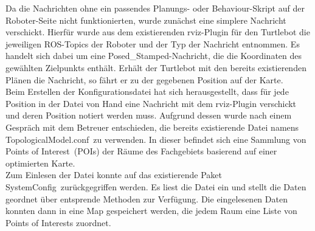 \documentclass[a4paper,12pt,headsepline]{scrartcl}
\begin{document}
		Da die Nachrichten ohne ein passendes Planungs- oder Behaviour-Skript auf der Roboter-Seite nicht funktionierten, wurde zunächst eine simplere Nachricht verschickt. Hierfür wurde aus dem existierenden rviz-Plugin für den Turtlebot die jeweiligen ROS-Topics der Roboter und der Typ der Nachricht entnommen. Es handelt sich dabei um eine \glqq Posed\_Stamped\grqq -Nachricht, die die Koordinaten des gewählten Zielpunkts enthält. Erhält der Turtlebot mit den bereits existierenden Plänen die Nachricht, so fährt er zu der gegebenen Position auf der Karte.\\
		Beim Erstellen der Konfigurationsdatei hat sich herausgestellt, dass für jede Position in der Datei von Hand eine Nachricht mit dem rviz-Plugin verschickt und deren Position notiert werden muss. Aufgrund dessen wurde nach einem Gespräch mit dem Betreuer entschieden, die bereits existierende Datei namens \glqq TopologicalModel.conf\grqq\ zu verwenden. In dieser befindet sich eine Sammlung von \glqq Points of Interest\grqq\ (POIs) der Räume des Fachgebiets basierend auf einer optimierten Karte.\\
Zum Einlesen der Datei konnte auf das existierende Paket \glqq SystemConfig\grqq\ zurückgegriffen werden. Es liest die Datei ein und stellt die Daten geordnet über entsprende Methoden zur Verfügung. Die eingelesenen Daten konnten dann in eine Map gespeichert werden, die jedem Raum eine Liste von Points of Interests zuordnet.\\
\end{document}
